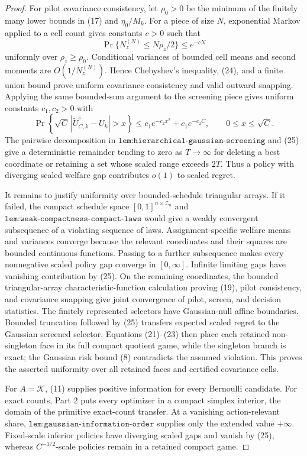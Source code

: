 \documentclass{article}
\begin{document}
\begin{proof}
For pilot covariance consistency, let \(\rho_0>0\) be the minimum of the finitely many lower bounds in (17) and \(\eta_0/M_k\).  For a piece of size \(N\), exponential Markov applied to a cell count gives constants \(c>0\) such that
\[
\Pr\{N_z^{(N)}\leq N\rho_z/2\}\leq e^{-cN}                       \tag{24}
\]
uniformly over \(\rho_z\geq\rho_0\).  Conditional variances of bounded cell means and second moments are \(O(1/N_z^{(N)})\).  Hence Chebyshev's inequality, (24), and a finite union bound prove uniform covariance consistency and valid outward snapping.  Applying the same bounded-sum argument to the screening piece gives uniform constants \(c_1,c_2>0\) with
\[
\Pr\!\left\{\sqrt C\,|\widetilde U_{C,k}^{\mathrm s}-U_k|>x\right\}
\leq c_1e^{-c_2x^2}+c_1e^{-c_2C},
\qquad 0\leq x\leq\sqrt C.                                      \tag{25}
\]
The pairwise decomposition in \(\texttt{lem:hierarchical-gaussian-screening}\) and (25) give a deterministic remainder tending to zero as \(T\to\infty\) for deleting a best coordinate or retaining a set whose scaled range exceeds \(2T\).  Thus a policy with diverging scaled welfare gap contributes \(o(1)\) to scaled regret.

It remains to justify uniformity over bounded-schedule triangular arrays.  If it failed, the compact schedule space \([0,1]^{n\times\mathcal Z_n}\) and \(\texttt{lem:weak-compactness-compact-laws}\) would give a weakly convergent subsequence of a violating sequence of laws.  Assignment-specific welfare means and variances converge because the relevant coordinates and their squares are bounded continuous functions.  Passing to a further subsequence makes every nonnegative scaled policy gap converge in \([0,\infty]\).  Infinite limiting gaps have vanishing contribution by (25).  On the remaining coordinates, the bounded triangular-array characteristic-function calculation proving (19), pilot consistency, and covariance snapping give joint convergence of pilot, screen, and decision statistics.  The finitely represented selectors have Gaussian-null affine boundaries.  Bounded truncation followed by (25) transfers expected scaled regret to the Gaussian screened selector.  Equations (21)--(23) then place each retained non-singleton face in its full compact quotient game, while the singleton branch is exact; the Gaussian risk bound (8) contradicts the assumed violation.  This proves the asserted uniformity over all retained faces and certified covariance cells.

For \(A=\mathcal K\), (11) supplies positive information for every Bernoulli candidate.  For exact counts, Part 2 puts every optimizer in a compact simplex interior, the domain of the primitive exact-count transfer.  At a vanishing action-relevant share, \(\texttt{lem:gaussian-information-order}\) supplies only the extended value \(+\infty\).  Fixed-scale inferior policies have diverging scaled gaps and vanish by (25), whereas \(C^{-1/2}\)-scale policies remain in a retained compact game.


\end{proof}
\end{document}
